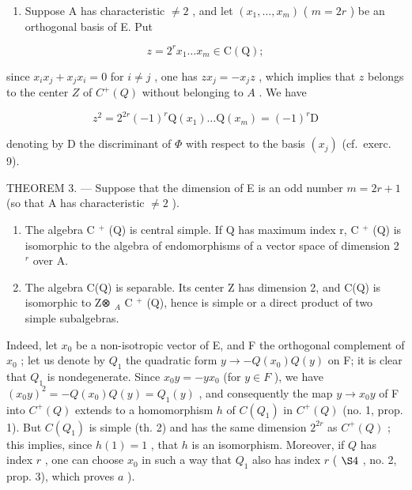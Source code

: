 \begin{enumerate}
\def\labelenumi{\arabic{enumi})}
\setcounter{enumi}{1}
\tightlist
\item
  Suppose A has characteristic \(\neq 2\) , and let \((x_{1},\ldots,x_{m})\) ( \(m=2r\) ) be an orthogonal basis of E. Put
\end{enumerate}

\[
z = 2 ^ {r} x _ {1} \dots x _ {m} \in \mathrm{C(Q)};
\]

since \(x_{i}x_{j} + x_{j}x_{i} = 0\) for \(i \neq j\) , one has \(zx_{j} = -x_{j}z\) , which implies that \(z\) belongs to the center \(Z\) of \(C^{+}(Q)\) without belonging to \(A\) . We have

\[
z ^ {2} = 2 ^ {2 r} (- 1) ^ {r} \mathrm{Q} (x _ {1}) \dots \mathrm{Q} (x _ {m}) = (- 1) ^ {r} \mathrm{D}
\]

denoting by D the discriminant of \(\Phi\) with respect to the basis \((x_{j})\) (cf.~exerc. 9).

THEOREM 3. --- Suppose that the dimension of E is an odd number \(m = 2r + 1\) (so that A has characteristic \(\neq 2\) ).

\begin{enumerate}
\def\labelenumi{\alph{enumi})}
\item
  The algebra C \(^{+}\) (Q) is central simple. If Q has maximum index r, C \(^{+}\) (Q) is isomorphic to the algebra of endomorphisms of a vector space of dimension 2 \(^{r}\) over A.
\item
  The algebra C(Q) is separable. Its center Z has dimension 2, and C(Q) is isomorphic to Z⊗ \(_{A}\) C \(^{+}\) (Q), hence is simple or a direct product of two simple subalgebras.
\end{enumerate}

Indeed, let \(x_0\) be a non-isotropic vector of E, and F the orthogonal complement of \(x_0\) ; let us denote by \(Q_1\) the quadratic form \(y \to -Q(x_0)Q(y)\) on F; it is clear that \(Q_1\) is nondegenerate. Since \(x_0y = -yx_0\) (for \(y \in F\) ), we have \((x_0y)^2 = -Q(x_0)Q(y) = Q_1(y)\) , and consequently the map \(y \to x_0y\) of F into \(C^+(Q)\) extends to a homomorphism \(h\) of \(C(Q_1)\) in \(C^+(Q)\) (no. 1, prop. 1). But \(C(Q_1)\) is simple (th. 2) and has the same dimension \(2^{2r}\) as \(C^{+}(Q)\) ; this implies, since \(h(1) = 1\) , that \(h\) is an isomorphism. Moreover, if \(Q\) has index \(r\) , one can choose \(x_0\) in such a way that \(Q_1\) also has index \(r\) ( \(\S 4\) , no. 2, prop. 3), which proves \(a\) ).

